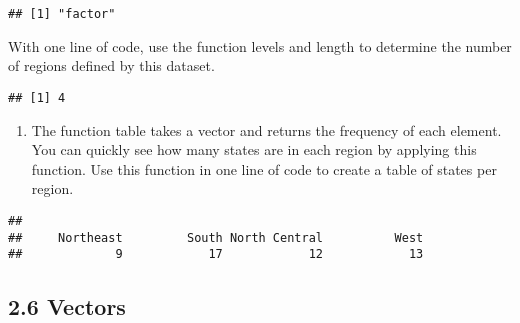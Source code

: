 \documentclass[
]{article}
\newenvironment{Shaded}{\begin{snugshade}}{\end{snugshade}}
\newcommand{\FunctionTok}[1]{\textcolor[rgb]{0.00,0.00,0.00}{#1}}
\newcommand{\NormalTok}[1]{#1}
\newcommand{\SpecialCharTok}[1]{\textcolor[rgb]{0.00,0.00,0.00}{#1}}
\providecommand{\tightlist}{%
  \setlength{\itemsep}{0pt}\setlength{\parskip}{0pt}}
\begin{document}
\begin{Shaded}
\end{Shaded}

\begin{verbatim}
## [1] "factor"
\end{verbatim}

With one line of code, use the function levels and length to determine
the number of regions defined by this dataset.

\begin{Shaded}
\end{Shaded}

\begin{verbatim}
## [1] 4
\end{verbatim}

\begin{enumerate}
\def\labelenumi{\arabic{enumi}.}
\setcounter{enumi}{5}
\tightlist
\item
  The function table takes a vector and returns the frequency of each
  element. You can quickly see how many states are in each region by
  applying this function. Use this function in one line of code to
  create a table of states per region.
\end{enumerate}

\begin{Shaded}
\end{Shaded}

\begin{verbatim}
## 
##     Northeast         South North Central          West 
##             9            17            12            13
\end{verbatim}

\hypertarget{vectors}{%
\subsection{2.6 Vectors}\label{vectors}}
\end{document}
